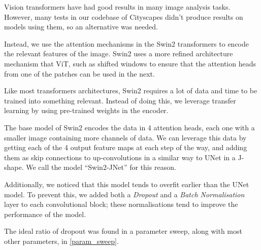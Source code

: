 Vision transformers have had good results in many image analysis tasks\cite{vision_transformers_a_survey}.
However, many tests in our codebase of Cityscapes didn't produce results on models using them, so an alternative was needed.

Instead, we use the attention mechanisms in the Swin2 transformers\cite{swin2} to encode the relevant features of the image.
Swin2 uses a more refined architecture mechanism that ViT, such as shifted windows to ensure that the attention heads from one of the patches can be used in the next.

Like most transformers architectures, Swin2 requires a lot of data and time to be trained into something relevant.
Instead of doing this, we leverage transfer learning by using pre-trained weights in the encoder.

The base model of Swin2 encodes the data in 4 attention heads, each one with a smaller image containing more channels of data.
We can leverage this data by getting each of the 4 output feature maps at each step of the way, and adding them as skip connections to up-convolutions in a similar way to UNet in a J-shape.
We call the model ``Swin2-JNet'' for this reason.

Additionally, we noticed that this model tends to overfit earlier than the UNet model.
To prevent this, we added both a \emph{Dropout} and a \emph{Batch Normalisation} layer to each convolutional block; these normalisations tend to improve the performance of the model.

The ideal ratio of dropout was found in a parameter sweep, along with most other parameters, in \cref{param_sweep}.

